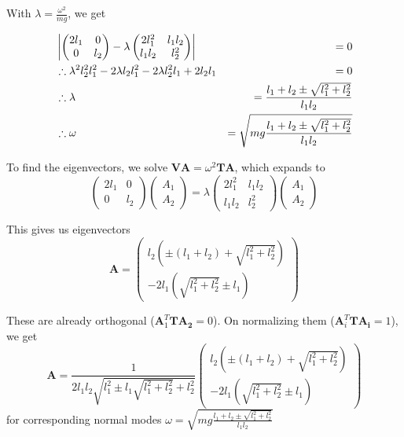 \documentclass[12pt]{article}
\begin{document}
With $\lambda=\frac{\omega^2}{mg}$, we get

\begin{align*}
&\left|\begin{pmatrix}
2l_1&0\\0&l_2
\end{pmatrix}-\lambda\begin{pmatrix}
2l_1^2 & l_1l_2\\
l_1l_2 & l_2^2
\end{pmatrix}\right| &=0\notag\\
&\therefore \lambda ^2 l_2^2 l_1^2-2 \lambda  l_2 l_1^2-2 \lambda  l_2^2 l_1+2 l_2 l_1 &=0 \notag\\
&\therefore \lambda &= \frac{l_1+l_2\pm\sqrt{l_1^2+l_2^2}}{l_1 l_2}\notag\\
&\therefore \omega &= \sqrt{mg\frac{l_1+l_2\pm\sqrt{l_1^2+l_2^2}}{l_1 l_2}}\notag
\end{align*}

To find the eigenvectors, we solve $\mathbf {VA}=\omega^2\mathbf{TA}$, which expands to $$\begin{pmatrix}
2l_1&0\\0&l_2
\end{pmatrix}\begin{pmatrix}
A_1\\A_2
\end{pmatrix}=\lambda\begin{pmatrix}
2l_1^2 & l_1l_2\\
l_1l_2 & l_2^2
\end{pmatrix}\begin{pmatrix}
A_1\\A_2
\end{pmatrix}$$

This gives us eigenvectors $$\mathbf A= \begin{pmatrix}
l_2 \left(\pm(l_1+l_2)+\sqrt{l_1^2+l_2^2}\right)\\
-2 l_1 \left(\sqrt{l_1^2+l_2^2}\pm l_1\right)
\end{pmatrix}$$

These are already orthogonal ($\mathbf A_1^T\mathbf{TA_2}=0$). On normalizing them ($\mathbf A_i^T\mathbf{TA_i}=1$), we get $$\boxed{\mathbf A=\frac1{2 l_1 l_2 \sqrt{l_1^2\pm  l_1\sqrt{l_1^2+l_2^2}+l_2^2}}\begin{pmatrix}
l_2 \left(\pm(l_1+l_2)+\sqrt{l_1^2+l_2^2}\right)\\
-2 l_1 \left(\sqrt{l_1^2+l_2^2}\pm l_1\right)
\end{pmatrix}}$$ for corresponding normal modes $\boxed{ \omega = \sqrt{mg\frac{l_1+l_2\pm\sqrt{l_1^2+l_2^2}}{l_1 l_2}}}$
\end{document}
